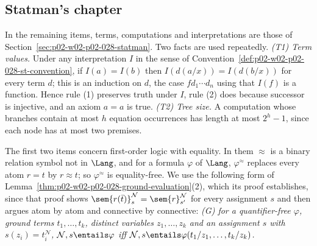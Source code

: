 \subsection*{Statman's chapter}

In the remaining items, terms, computations and interpretations are those of
Section~\ref{sec:p02-w02-p02-028-statman}.  Two facts are used repeatedly.
\emph{(T1) Term values.}  Under any interpretation \(I\) in the sense of
Convention~\ref{def:p02-w02-p02-028-st-convention}, if \(I(a)=I(b)\) then
\(I(d(a/x))=I(d(b/x))\) for every term \(d\); this is an induction on \(d\),
the case \(fd_1\cdots d_n\) using that \(I(f)\) is a function.  Hence rule
(1) preserves truth under \(I\), rule (2) does because successor is
injective, and an axiom \(a=a\) is true.  \emph{(T2) Tree size.}  A
computation whose branches contain at most \(h\) equation occurrences has
length at most \(2^h-1\), since each node has at most two premises.

The first two items concern first-order logic with equality.  In them
\(\approx\) is a binary relation symbol not in \(\Lang\), and for a formula
\(\varphi\) of \(\Lang\), \(\varphi^{\approx}\) replaces every atom \(r=t\) by
\(r\approx t\); so \(\varphi^{\approx}\) is equality-free.  We use the
following form of Lemma~\ref{thm:p02-w02-p02-028-ground-evaluation}(2), which
its proof establishes, since that proof shows
\(\sem{r(\bar t)}^{\mathcal N}_s=\sem{r}^{\mathcal N}_{s'}\) for every
assignment \(s\) and then argues atom by atom and connective by connective:
\emph{(G) for a quantifier-free \(\varphi\), ground terms \(t_1,\ldots,t_k\),
distinct variables \(z_1,\ldots,z_k\) and an assignment \(s\) with
\(s(z_i)=t_i^{\mathcal N}\), \(\mathcal N,s\entails\varphi\) iff
\(\mathcal N,s\entails\varphi(t_1/z_1,\ldots,t_k/z_k)\).}


